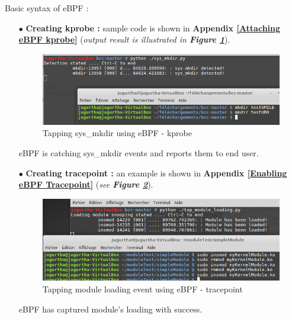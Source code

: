 Basic syntax of eBPF : 

\begin{itemize}
	\item[$\bullet$] \textbf{Creating kprobe : } sample code is shown in \textbf{\color{red}Appendix {\color{blue}\ref{Attaching eBPF kprobe}}} (\textit{output result is illustrated in \textbf{Figure \ref{Tapping sys-mkdir using eBPF}}}).	
					\begin{figure}[H]
						\centering
        				\includegraphics[scale=0.4]{img/solution/sys_mkdir_detected.png}
        				\caption{Tapping sys\_mkdir using eBPF - kprobe}
        				\label{Tapping sys-mkdir using eBPF}
    				\end{figure}	
	eBPF is catching \og sys\_mkdir \fg events and reports them to end user.
	
	\item[$\bullet$] \textbf{Creating tracepoint : } an example is shown in \textbf{\color{red}Appendix {\color{blue}\ref{Enabling eBPF Tracepoint}}} 	 (\textit{see \textbf{Figure \ref{Tapping module loading event using eBPF - tracepoint}}}).	
	
					\begin{figure}[H]
						\centering
        				\includegraphics[scale=0.4]{img/solution/creating-ebpf-tracepoint.png}
        				\caption{Tapping module loading event using eBPF - tracepoint}
        				\label{Tapping module loading event using eBPF - tracepoint}
    				\end{figure}		
	
	eBPF has captured module's loading with success.
\end{itemize}

